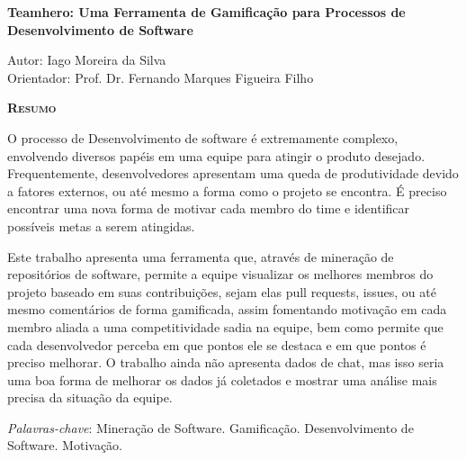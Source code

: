 \begin{center}
	{\Large{\textbf{Teamhero: Uma Ferramenta de Gamificação para Processos de Desenvolvimento de Software}}}
\end{center}

\vspace{1cm}

\begin{flushright}
	Autor: Iago Moreira da Silva\\
	Orientador: Prof. Dr. Fernando Marques Figueira Filho
\end{flushright}

\vspace{1cm}

\begin{center}
	\Large{\textsc{\textbf{Resumo}}}
\end{center}

\noindent
O processo de Desenvolvimento de software é extremamente complexo, envolvendo diversos papéis em uma equipe para atingir o produto desejado. Frequentemente, desenvolvedores apresentam uma queda de produtividade devido a fatores externos, ou até mesmo a forma como o projeto se encontra. É preciso encontrar uma nova forma de motivar cada membro do time e identificar possíveis metas a serem atingidas.

\noindent
Este trabalho apresenta uma ferramenta que, através de mineração de repositórios de software, permite a equipe visualizar os melhores membros do projeto baseado em suas contribuições, sejam elas pull requests, issues, ou até mesmo comentários de forma gamificada, assim fomentando motivação em cada membro aliada a uma competitividade sadia na equipe, bem como permite que cada desenvolvedor perceba em que pontos ele se destaca e em que pontos é preciso melhorar. O trabalho ainda não apresenta dados de chat, mas isso seria uma boa forma de melhorar os dados já coletados e mostrar uma análise mais precisa da situação da equipe.

\noindent\textit{Palavras-chave}: Mineração de Software. Gamificação. Desenvolvimento de Software. Motivação.
